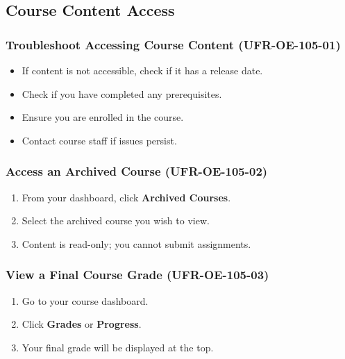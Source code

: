 \subsection{Course Content Access}

\subsubsection{Troubleshoot Accessing Course Content (UFR-OE-105-01)}
\begin{itemize}
    \item If content is not accessible, check if it has a release date.
    \item Check if you have completed any prerequisites.
    \item Ensure you are enrolled in the course.
    \item Contact course staff if issues persist.
\end{itemize}

\subsubsection{Access an Archived Course (UFR-OE-105-02)}
\begin{enumerate}
    \item From your dashboard, click \textbf{Archived Courses}.
    \item Select the archived course you wish to view.
    \item Content is read-only; you cannot submit assignments.
\end{enumerate}

\subsubsection{View a Final Course Grade (UFR-OE-105-03)}
\begin{enumerate}
    \item Go to your course dashboard.
    \item Click \textbf{Grades} or \textbf{Progress}.
    \item Your final grade will be displayed at the top.
\end{enumerate}

